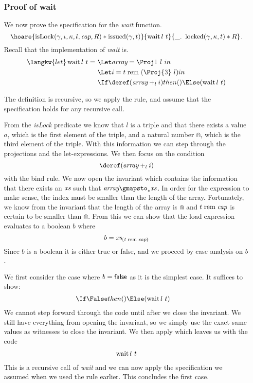 \subsubsection{Proof of wait}

We now prove the specification for the \textit{wait} function.
\[
\hoare{ \isLockA \ast \issued(\gamma, t) }
      { \wait l\ t}
      { \_.\ \locked(\gamma, \kappa, t) \ast R }.
\]
Recall that the implementation of \textit{wait} is.
\begin{align*}
\langkw{let} \wait l\ t =\ &
      \Let \Array = \Proj1\ l\ in \\
    & \Let i = t \Rem (\Proj{3}\ l) in \\
    & \If \deref (\Array \plusl i) then () \Else (\wait l\ t)
\end{align*}

The definition is recursive, so we apply the  rule, and assume
that the specification holds for any recursive call.

From the \textit{isLock} predicate we know that $l$ is a triple and that there
exists a value $a$, which is the first element of the triple, and a natural
number $\Cap$, which is the third element of the triple. With this information we
can step through the projections and the \textsf{let}-expressions. We then focus on
the condition 
\begin{equation*}
     \deref (\Array \plusl i)
\end{equation*}
with the bind rule.
We now open the invariant which contains the information that there exists an
$\textit{xs}$ such that $\Array \gmapsto_{*} \xs$. In order for the expression to make
sense, the index must be smaller than the length of the array. Fortunately, we
know from the invariant that the length of the array is $\Cap$ and $t \;\mathrm{rem}\; \textit{cap}$
is certain to be smaller than $\Cap$. From this we can show that the load
expression evaluates to a boolean $b$ where
\begin{equation} \label{eq:bvalue}
 b = \textit{xs}_{(t \;\mathrm{rem}\; \textit{cap})}
\end{equation}
Since $b$ is a boolean it is either true or false, and we proceed by case
analysis on $b$.

We first consider the case where $b = \textsf{false}$ as it is the simplest case.
It suffices to show:
\begin{align*}
     & \If \False then () \Else (\wait l\ t)
\end{align*}
We cannot step forward through the code until after we close the invariant. We
still have everything from opening the invariant, so we simply use the exact same
values as witnesses to close the invariant. We then apply 
which leaves us with the code
\begin{align*}
   \operatorname{wait} l\ t
\end{align*}
This is a recursive call of \textit{wait} and we can now apply the
specification we assumed when we used the  rule earlier. This
concludes the first case.

